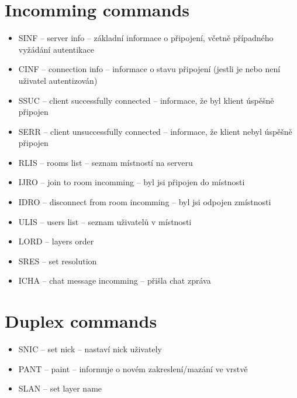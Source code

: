 \section{Incomming commands}

\begin{itemize}
    \item SINF -- server info -- základní informace o připojení, včetně případného vyžádání autentikace
    \item CINF -- connection info -- informace o stavu připojení (jestli je nebo není uživatel autentizován)
    \item SSUC -- client successfully connected -- informace, že byl klient úspěšně připojen
    \item SERR -- client unsuccessfully connected -- informace, že klient nebyl úspěšně připojen
    \item RLIS -- rooms list -- seznam místností na serveru
    \item IJRO -- join to room incomming -- byl jsi připojen do místnosti
    \item IDRO -- disconnect from room incomming -- byl jsi odpojen zmístnosti
    \item ULIS -- users list -- seznam uživatelů v místnosti
	\item LORD -- layers order
	\item SRES -- set resolution
	\item ICHA -- chat message incomming -- přišla chat zpráva
\end{itemize}

\section{Duplex commands}

\begin{itemize}
    \item SNIC -- set nick -- nastaví nick uživately
	\item PANT -- paint -- informuje o novém zakreslení/mazání ve vrstvě 
	\item SLAN -- set layer name
\end{itemize}




%


